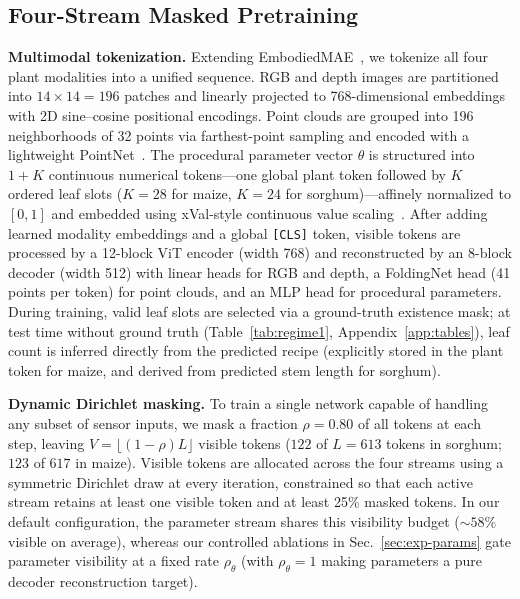 \documentclass[10pt,twocolumn,letterpaper]{article}
\begin{document}
\subsection{Four-Stream Masked Pretraining}
\label{sec:method-pretrain}

\noindent\textbf{Multimodal tokenization.}
Extending EmbodiedMAE~\citep{dong2025embodiedmae}, we tokenize all four plant modalities into a unified sequence. RGB and depth images are partitioned into $14 \times 14 = 196$ patches and linearly projected to 768-dimensional embeddings with 2D sine--cosine positional encodings. Point clouds are grouped into 196 neighborhoods of 32 points via farthest-point sampling and encoded with a lightweight PointNet~\citep{pang2022pointmae,qi2017pointnet}. The procedural parameter vector $\theta$ is structured into $1 + K$ continuous numerical tokens---one global plant token followed by $K$ ordered leaf slots ($K = 28$ for maize, $K = 24$ for sorghum)---affinely normalized to $[0,1]$ and embedded using xVal-style continuous value scaling~\citep{golkar2023xval}. After adding learned modality embeddings and a global \texttt{[CLS]} token, visible tokens are processed by a 12-block ViT encoder (width 768) and reconstructed by an 8-block decoder (width 512) with linear heads for RGB and depth, a FoldingNet head (41 points per token) for point clouds, and an MLP head for procedural parameters. During training, valid leaf slots are selected via a ground-truth existence mask; at test time without ground truth (Table~\ref{tab:regime1}, Appendix~\ref{app:tables}), leaf count is inferred directly from the predicted recipe (explicitly stored in the plant token for maize, and derived from predicted stem length for sorghum).

\noindent\textbf{Dynamic Dirichlet masking.}
To train a single network capable of handling any subset of sensor inputs, we mask a fraction $\rho = 0.80$ of all tokens at each step, leaving $V = \lfloor (1-\rho)L \rfloor$ visible tokens ($122$ of $L = 613$ tokens in sorghum; $123$ of $617$ in maize). Visible tokens are allocated across the four streams using a symmetric Dirichlet draw at every iteration, constrained so that each active stream retains at least one visible token and at least 25\% masked tokens. In our default configuration, the parameter stream shares this visibility budget ($\sim 58\%$ visible on average), whereas our controlled ablations in Sec.~\ref{sec:exp-params} gate parameter visibility at a fixed rate $\rho_\theta$ (with $\rho_\theta = 1$ making parameters a pure decoder reconstruction target).
\end{document}
